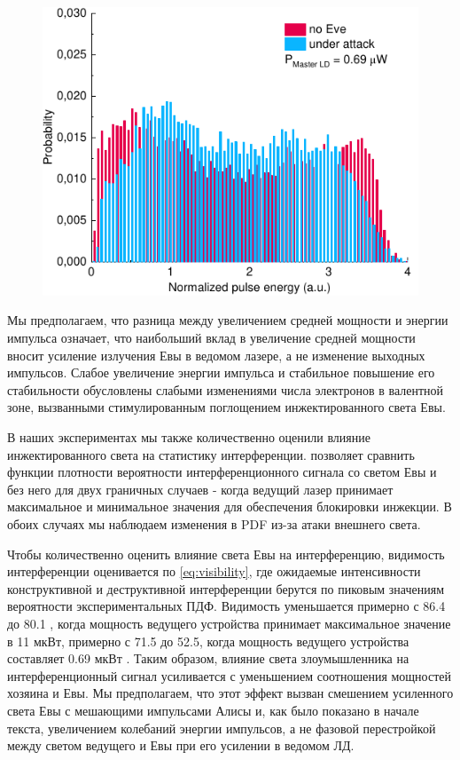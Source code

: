 \begin{figure}
	\includegraphics[width=\linewidth]{images/hist_attack_01.pdf}
	\caption{}
\end{figure}
\label{fig:histogram}

Мы предполагаем, что разница между увеличением средней мощности и энергии импульса означает, что наибольший вклад в увеличение средней мощности вносит усиление излучения Евы в ведомом лазере, а не изменение выходных импульсов. Слабое увеличение энергии импульса и стабильное повышение его стабильности обусловлены слабыми изменениями числа электронов в валентной зоне, вызванными стимулированным поглощением инжектированного света Евы. 

В наших экспериментах мы также количественно оценили влияние инжектированного света на статистику интерференции.  позволяет сравнить функции плотности вероятности интерференционного сигнала со светом Евы и без него для двух граничных случаев - когда ведущий лазер принимает максимальное и минимальное значения для обеспечения блокировки инжекции. В обоих случаях мы наблюдаем изменения в PDF из-за атаки внешнего света.

Чтобы количественно оценить влияние света Евы на интерференцию, видимость интерференции оценивается по \cref{eq:visibility}, где ожидаемые интенсивности конструктивной и деструктивной интерференции берутся по пиковым значениям вероятности экспериментальных ПДФ. Видимость уменьшается примерно с 86.4 до 80.1 , когда мощность ведущего устройства принимает максимальное значение в 11 мкВт, примерно с 71.5 до 52.5, когда мощность ведущего устройства составляет 0.69 мкВт . Таким образом, влияние света злоумышленника на интерференционный сигнал усиливается с уменьшением соотношения мощностей хозяина и Евы. Мы предполагаем, что этот эффект вызван смешением усиленного света Евы с мешающими импульсами Алисы и, как было показано в начале текста, увеличением колебаний энергии импульсов, а не фазовой перестройкой между светом ведущего и Евы при его усилении в ведомом ЛД.
